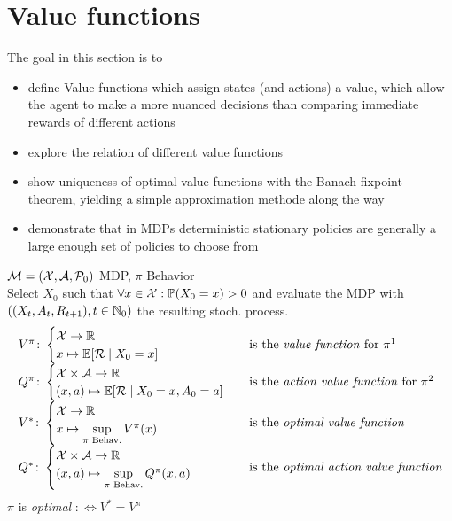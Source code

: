 \section{Value functions}
The goal in this section is to
\begin{itemize}[itemsep=0pt, topsep=1pt]
\item define Value functions which assign states (and actions) a value, which allow the agent to make a more nuanced decisions than comparing immediate rewards of different actions
\item explore the relation of different value functions
\item show uniqueness of optimal value functions with the Banach fixpoint theorem, yielding a simple approximation methode along the way
\item demonstrate that in MDPs deterministic stationary policies are generally a large enough set of policies to choose from
 \end{itemize}
\begin{definition}\(\mathcal{M}=(\mathcal{X},\mathcal{A},\mathcal{P}_0)\) MDP, \(\pi\) Behavior\\
Select \(X_0\) such that \(\forall x\in\mathcal{X}:\mathbb{P}(X_0=x)>0\) and evaluate the MDP with
\(((X_t,A_t,R_{t+1}), t\in \mathbb{N}_0)\) the resulting stoch. process.\\
\def\arraystretch{3}
\[
\begin{array}{l l}
	V^\pi\colon
	\begin{cases}
		\cX\to\R\\
		x\mapsto \E[\cR\mid X_0=x]
	\end{cases} 
	& \text{is the \emph{value function} for } \pi \footnotemark\\
	Q^\pi\colon
	\begin{cases}
		\cX\times\cA\to\R\\
		(x,a)\mapsto \E[\cR\mid X_0=x, A_0=a]
	\end{cases}
	& \text{is the \emph{action value function} for } \pi \footnotemark\\
	V^*\colon
	\begin{cases}
		\cX\to\R\\
		x\mapsto \sup\limits_{\pi\text{ Behav.}} V^\pi(x)
	\end{cases} 
	& \text{is the \emph{optimal value function}}\\
	Q^*\colon
	\begin{cases}
		\cX\times\cA\to\R\\
		(x,a)\mapsto \sup\limits_{\pi\text{ Behav.}} Q^\pi(x,a)
	\end{cases}
	& \text{is the \emph{optimal action value function}}
\end{array}
\]
\(\pi\) is \emph{optimal} \(:\iff V^*=V^\pi\)
\end{definition}

